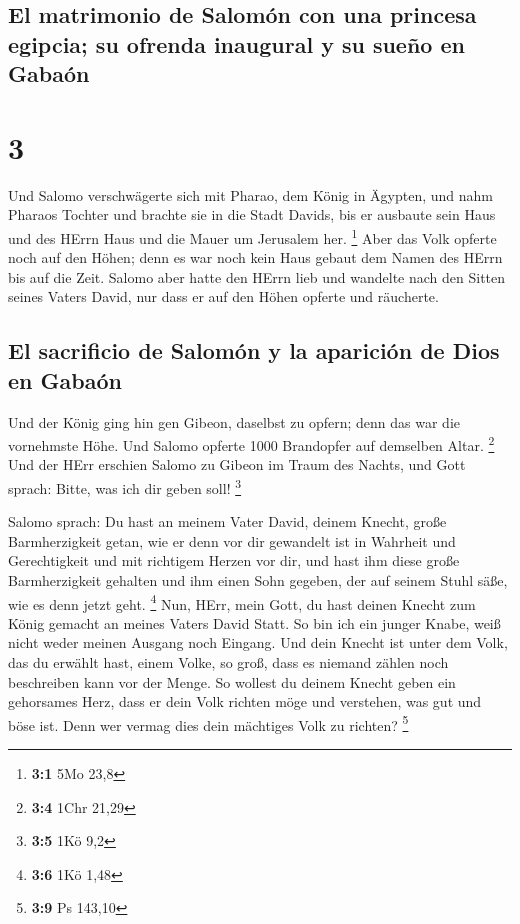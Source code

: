 \hypertarget{el-matrimonio-de-salomuxf3n-con-una-princesa-egipcia-su-ofrenda-inaugural-y-su-sueuxf1o-en-gabauxf3n}{%
\subsection{El matrimonio de Salomón con una princesa egipcia; su
ofrenda inaugural y su sueño en
Gabaón}\label{el-matrimonio-de-salomuxf3n-con-una-princesa-egipcia-su-ofrenda-inaugural-y-su-sueuxf1o-en-gabauxf3n}}

\hypertarget{section-2}{%
\section{3}\label{section-2}}

 Und Salomo verschwägerte sich mit Pharao, dem König in
Ägypten, und nahm Pharaos Tochter und brachte sie in die Stadt Davids,
bis er ausbaute sein Haus und des HErrn Haus und die Mauer um Jerusalem
her. \footnote{\textbf{3:1} 5Mo 23,8}  Aber das Volk
opferte noch auf den Höhen; denn es war noch kein Haus gebaut dem Namen
des HErrn bis auf die Zeit.  Salomo aber hatte den HErrn
lieb und wandelte nach den Sitten seines Vaters David, nur dass er auf
den Höhen opferte und räucherte.

\hypertarget{el-sacrificio-de-salomuxf3n-y-la-apariciuxf3n-de-dios-en-gabauxf3n}{%
\subsection{El sacrificio de Salomón y la aparición de Dios en
Gabaón}\label{el-sacrificio-de-salomuxf3n-y-la-apariciuxf3n-de-dios-en-gabauxf3n}}

 Und der König ging hin gen Gibeon, daselbst zu opfern;
denn das war die vornehmste Höhe. Und Salomo opferte 1000 Brandopfer auf
demselben Altar. \footnote{\textbf{3:4} 1Chr 21,29}  Und
der HErr erschien Salomo zu Gibeon im Traum des Nachts, und Gott sprach:
Bitte, was ich dir geben soll! \footnote{\textbf{3:5} 1Kö 9,2}

 Salomo sprach: Du hast an meinem Vater David, deinem
Knecht, große Barmherzigkeit getan, wie er denn vor dir gewandelt ist in
Wahrheit und Gerechtigkeit und mit richtigem Herzen vor dir, und hast
ihm diese große Barmherzigkeit gehalten und ihm einen Sohn gegeben, der
auf seinem Stuhl säße, wie es denn jetzt geht. \footnote{\textbf{3:6}
  1Kö 1,48}  Nun, HErr, mein Gott, du hast deinen Knecht
zum König gemacht an meines Vaters David Statt. So bin ich ein junger
Knabe, weiß nicht weder meinen Ausgang noch Eingang.  Und
dein Knecht ist unter dem Volk, das du erwählt hast, einem Volke, so
groß, dass es niemand zählen noch beschreiben kann vor der Menge.
 So wollest du deinem Knecht geben ein gehorsames Herz,
dass er dein Volk richten möge und verstehen, was gut und böse ist. Denn
wer vermag dies dein mächtiges Volk zu richten? \footnote{\textbf{3:9}
  Ps 143,10}


